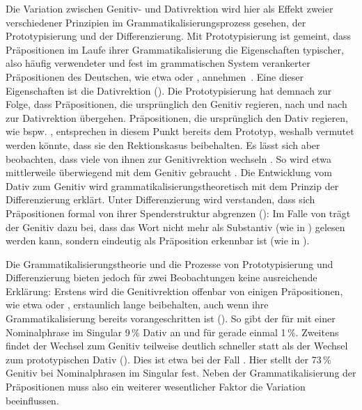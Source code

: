 Die Variation zwischen Genitiv- und Dativrektion wird hier als Effekt zweier verschiedener Prinzipien im Grammatikalisierungsprozess gesehen, der Prototypisierung und der Differenzierung. 
Mit Prototypisierung ist gemeint, dass Präpositionen im Laufe ihrer Grammatikalisierung die Eigenschaften typischer, also häufig verwendeter und fest im grammatischen System verankerter Präpositionen des Deutschen, wie etwa  oder ,  annehmen~\citep[s.][17]{Lindqvist1994}. 
Eine dieser Eigenschaften ist die Dativrektion (\cites[s.][15--16]{Lindqvist1994}[94]{Szczepaniak2011}). 
Die Prototypisierung hat demnach zur Folge, dass Präpositionen, die ursprünglich den Genitiv regieren, nach und nach zur Dativrektion übergehen.
Präpositionen, die ursprünglich den Dativ regieren, wie bspw. \dank{}, entsprechen in diesem Punkt bereits dem Prototyp, weshalb vermutet werden könnte, dass sie den Rektionskasus beibehalten.
Es lässt sich aber beobachten, dass viele von ihnen zur Genitivrektion wechseln \citep[s.][256]{DiMeola2005b}. 
So wird etwa \dank{} mittlerweile überwiegend mit dem Genitiv gebraucht \citep[s.][§1450]{Duden2022}. 
Die Entwicklung vom Dativ zum Genitiv wird grammatikalisierungstheoretisch mit dem Prinzip der Differenzierung erklärt. 
Unter Differenzierung wird verstanden, dass sich Präpositionen formal von ihrer Spenderstruktur abgrenzen (\cites[s.][144]{DiMeola2000}[422]{DiMeola2006}): 
Im Falle von \dank{} trägt der Genitiv dazu bei, dass das Wort nicht mehr als Substantiv (wie in ) gelesen werden kann, sondern eindeutig als Präposition erkennbar ist (wie in ).

Die Grammatikalisierungstheorie und die Prozesse von Prototypisierung und Differenzierung bieten jedoch für zwei Beobachtungen keine ausreichende Erklärung: 
Erstens wird die Genitivrektion offenbar von einigen Präpositionen, wie etwa \wegen{} oder \waehrend{}, erstaunlich lange beibehalten, auch wenn ihre Grammatikalisierung bereits vorangeschritten ist (\cites[s.][218--219]{DiMeola2003}[][214]{Vieregge.2019}).
So gibt der \citet[§915]{Duden2016} für \waehrend{} mit einer Nominalphrase im Singular 9\,\% Dativ an und für \wegen{} gerade einmal 1\,\%. 
Zweitens findet der Wechsel zum Genitiv teilweise deutlich schneller statt als der Wechsel zum prototypischen Dativ (\cites[s.][216]{DiMeola2000}[][214]{Vieregge.2019}). 
Dies ist etwa bei \dank{} der Fall \citep[s.][257]{Baumann2014}. 
Hier stellt der \citet[§915]{Duden2016} 73\,\% Genitiv bei Nominalphrasen im Singular fest. 
Neben der Grammatikalisierung der Präpositionen muss also ein weiterer wesentlicher Faktor die Variation beeinflussen. 

